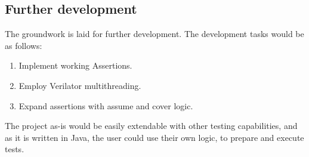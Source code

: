 \subsection{Further development}
The groundwork is laid for further development. The development tasks would be as follows:
\begin{enumerate}
    \item Implement working Assertions.
    \item Employ Verilator multithreading.
    \item Expand assertions with assume and cover logic.
\end{enumerate}
The project as-is would be easily extendable with other testing capabilities, and as it is written in Java, the user could use their own logic, to prepare and execute tests.